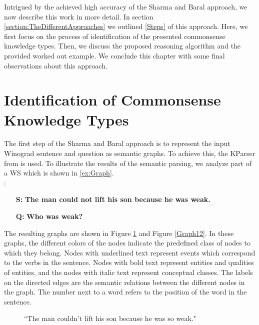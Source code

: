 \label{knowledge_types}
Intrigued by the achieved high accuracy of the Sharma and Baral \cite{2018CommonsenseKT} approach, we now describe this work in more detail. In section \ref{section:TheDifferentApproaches} we outlined \underline{\ref{Steps}} of this approach. Here, we first focus on the process of identification of the presented commonsense knowledge types. Then, we discuss the proposed reasoning algorithm and the provided worked out example. We conclude this chapter with some final observations about this approach.


\section{Identification of Commonsense Knowledge Types}
The first step of the Sharma and Baral \cite{2018CommonsenseKT} approach is to represent the input Winograd sentence and question as semantic graphs. To achieve this, the KParser from \cite{DBLP:conf/ijcai/SharmaVAB15} is used. 
To illustrate the results of the semantic parsing, we analyze part of a WS which is shown in \ref{ex:Graph}.  \\ 
:
\begin{itemize}
	\item[\textbf{S:}] \textbf{The man could not lift his son because he was weak.}
	\item[\textbf{Q:}] \textbf{Who was weak?}
\end{itemize}

The  resulting graphs are shown in Figure \ref{Graph11} and Figure \ref{Graph12}.
In these graphs, the different colors of the nodes indicate the predefined class of nodes to which they belong. 
Nodes with underlined text represent events which correspond to the verbs in the sentence. Nodes with bold text represent entities and qualities of entities, and the nodes with italic text represent conceptual classes. The labels on the directed edges are the semantic relations between the different nodes in the graph. The number next to a word refers to the position of the word in the sentence. 
\begin{figure} [h!]
	\centering
	
	\caption{\label{Graph11}``The man couldn't lift his son because he was so weak."}
\end{figure}


